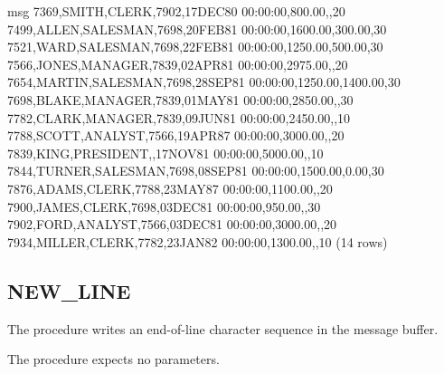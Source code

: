 \documentclass[letterpaper,10pt,english,openany,oneside]{sphinxmanual}
\begin{document}
\begin{sphinxVerbatim}[commandchars=\\\{\}]
                               msg
\PYGZhy{}\PYGZhy{}\PYGZhy{}\PYGZhy{}\PYGZhy{}\PYGZhy{}\PYGZhy{}\PYGZhy{}\PYGZhy{}\PYGZhy{}\PYGZhy{}\PYGZhy{}\PYGZhy{}\PYGZhy{}\PYGZhy{}\PYGZhy{}\PYGZhy{}\PYGZhy{}\PYGZhy{}\PYGZhy{}\PYGZhy{}\PYGZhy{}\PYGZhy{}\PYGZhy{}\PYGZhy{}\PYGZhy{}\PYGZhy{}\PYGZhy{}\PYGZhy{}\PYGZhy{}\PYGZhy{}\PYGZhy{}\PYGZhy{}\PYGZhy{}\PYGZhy{}\PYGZhy{}\PYGZhy{}\PYGZhy{}\PYGZhy{}\PYGZhy{}\PYGZhy{}\PYGZhy{}\PYGZhy{}\PYGZhy{}\PYGZhy{}\PYGZhy{}\PYGZhy{}\PYGZhy{}\PYGZhy{}\PYGZhy{}\PYGZhy{}\PYGZhy{}\PYGZhy{}\PYGZhy{}\PYGZhy{}\PYGZhy{}\PYGZhy{}\PYGZhy{}\PYGZhy{}\PYGZhy{}\PYGZhy{}\PYGZhy{}\PYGZhy{}\PYGZhy{}\PYGZhy{}
 7369,SMITH,CLERK,7902,17\PYGZhy{}DEC\PYGZhy{}80 00:00:00,800.00,,20
 7499,ALLEN,SALESMAN,7698,20\PYGZhy{}FEB\PYGZhy{}81 00:00:00,1600.00,300.00,30
 7521,WARD,SALESMAN,7698,22\PYGZhy{}FEB\PYGZhy{}81 00:00:00,1250.00,500.00,30
 7566,JONES,MANAGER,7839,02\PYGZhy{}APR\PYGZhy{}81 00:00:00,2975.00,,20
 7654,MARTIN,SALESMAN,7698,28\PYGZhy{}SEP\PYGZhy{}81 00:00:00,1250.00,1400.00,30
 7698,BLAKE,MANAGER,7839,01\PYGZhy{}MAY\PYGZhy{}81 00:00:00,2850.00,,30
 7782,CLARK,MANAGER,7839,09\PYGZhy{}JUN\PYGZhy{}81 00:00:00,2450.00,,10
 7788,SCOTT,ANALYST,7566,19\PYGZhy{}APR\PYGZhy{}87 00:00:00,3000.00,,20
 7839,KING,PRESIDENT,,17\PYGZhy{}NOV\PYGZhy{}81 00:00:00,5000.00,,10
 7844,TURNER,SALESMAN,7698,08\PYGZhy{}SEP\PYGZhy{}81 00:00:00,1500.00,0.00,30
 7876,ADAMS,CLERK,7788,23\PYGZhy{}MAY\PYGZhy{}87 00:00:00,1100.00,,20
 7900,JAMES,CLERK,7698,03\PYGZhy{}DEC\PYGZhy{}81 00:00:00,950.00,,30
 7902,FORD,ANALYST,7566,03\PYGZhy{}DEC\PYGZhy{}81 00:00:00,3000.00,,20
 7934,MILLER,CLERK,7782,23\PYGZhy{}JAN\PYGZhy{}82 00:00:00,1300.00,,10
(14 rows)
\end{sphinxVerbatim}

\newpage


\subsection{NEW\_LINE}
\label{\detokenize{dbms_output:new-line}}
The  procedure writes an end-of-line character sequence in the
message buffer.
\begin{quote}

\end{quote}


The  procedure expects no parameters.

\newpage

\ignorespaces 
\end{document}
